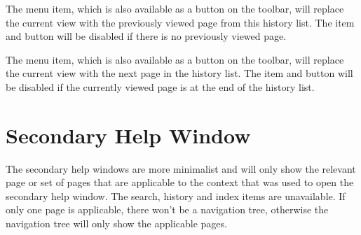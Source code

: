 
The  menu item, which is
also available as a button on the toolbar, will replace the current
view with the previously viewed page from this history list. The
item and button will be disabled if there is no previously viewed
page. 


The  menu item, which is
also available as a button on the toolbar, will replace the current view with the
next page in the history list. The item and button will be disabled if the
currently viewed page is at the end of the history list. 

\section{Secondary Help Window}
\label{sec:secondaryhelp}

The secondary help windows are more minimalist and will only show
the relevant page or set of pages that are applicable to the context
that was used to open the secondary help window. The search, history
and index items are unavailable. If only one page is applicable,
there won't be a navigation tree, otherwise the navigation tree will
only show the applicable pages.

